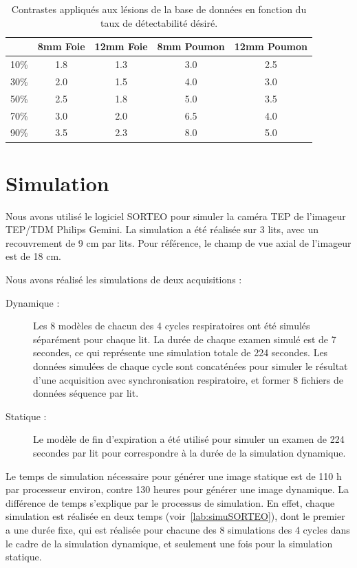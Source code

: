 \begin{table}

\centering

\begin{tabular}{|c||c|c||c|c|}
 \hline
	& 8mm Foie	& 12mm Foie	& 8mm Poumon	& 12mm Poumon	\\
\hline
10\%	& 1.8		& 1.3		& 3.0		& 2.5		\\
\hline
30\%	& 2.0		& 1.5		& 4.0		& 3.0		\\
\hline
50\%	& 2.5		& 1.8		& 5.0		& 3.5		\\
\hline
70\%	& 3.0		& 2.0		& 6.5		& 4.0		\\
\hline
90\%	& 3.5		& 2.3		& 8.0		& 5.0		\\
\hline
\end{tabular}
\caption[Contraste final lésions du foie et du poumon]{Contrastes appliqués aux lésions de la base de données en fonction du taux de détectabilité désiré.}
\label{tab:contrasteFoieFinal}
\end{table}

\section{Simulation}

Nous avons utilisé le logiciel SORTEO pour simuler la caméra TEP de l'imageur TEP/TDM Philips Gemini. La simulation a été réalisée sur 3 lits, avec un recouvrement de 9 cm par lits. Pour référence, le champ de vue axial de l'imageur est de 18 cm.

Nous avons réalisé les simulations de deux acquisitions :
\begin{description}
\item[Dynamique :] Les 8 modèles de chacun des 4 cycles respiratoires ont été simulés séparément pour chaque lit. La durée de chaque examen simulé est de 7 secondes, ce qui représente une simulation totale de 224 secondes. Les données simulées de chaque cycle sont concaténées pour simuler le résultat d'une acquisition avec synchronisation respiratoire, et former 8 fichiers de données séquence par lit.
\item[Statique :] Le modèle de fin d'expiration a été utilisé pour simuler un examen de 224 secondes par lit pour correspondre à la durée de la simulation dynamique.
\end{description}

Le temps de simulation nécessaire pour générer une image statique est de 110 h par processeur environ, contre 130 heures pour générer une image dynamique. La différence de temps s'explique par le processus de simulation. En effet, chaque simulation est réalisée en deux temps (voir~\ref{lab:simuSORTEO}), dont le premier a une durée fixe, qui est réalisée pour chacune des 8 simulations des 4 cycles dans le cadre de la simulation dynamique, et seulement une fois pour la simulation statique.


